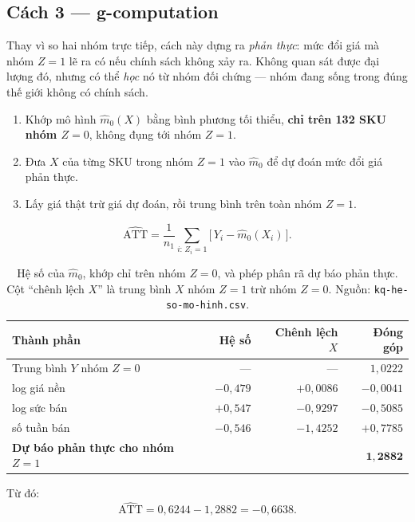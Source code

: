 \documentclass[11pt]{article}
\begin{document}
\subsection{Cách 3 --- g-computation}
\label{sec:cach-3}

Thay vì so hai nhóm trực tiếp, cách này dựng ra \emph{phản thực}: mức đổi giá mà nhóm $Z=1$ lẽ ra
có nếu chính sách không xảy ra. Không quan sát được đại lượng đó, nhưng có thể \emph{học} nó từ
nhóm đối chứng --- nhóm đang sống trong đúng thế giới không có chính sách.

\begin{enumerate}
  \item Khớp mô hình $\hat m_0(X)$ bằng bình phương tối thiểu, \textbf{chỉ trên 132 SKU nhóm
  $Z=0$}, không đụng tới nhóm $Z=1$.
  \item Đưa $X$ của từng SKU trong nhóm $Z=1$ vào $\hat m_0$ để dự đoán mức đổi giá phản thực.
  \item Lấy giá thật trừ giá dự đoán, rồi trung bình trên toàn nhóm $Z=1$.
\end{enumerate}

\begin{equation}
  \widehat{\mathrm{ATT}}
  = \frac{1}{n_1}\sum_{i:\,Z_i = 1} \Big[\, Y_i - \hat m_0(X_i) \,\Big].
  \label{eq:g-comp}
\end{equation}

\begin{table}[htbp]
  \centering
  \caption{Hệ số của $\hat m_0$, khớp chỉ trên nhóm $Z=0$, và phép phân rã dự báo phản thực. Cột
  ``chênh lệch $X$'' là trung bình $X$ nhóm $Z=1$ trừ nhóm $Z=0$. Nguồn:
  \texttt{kq-he-so-mo-hinh.csv}.}
  \label{tab:g-comp}
  \begin{tabular}{lrrr}
    \toprule
    Thành phần & Hệ số & Chênh lệch $X$ & Đóng góp \\
    \midrule
    Trung bình $Y$ nhóm $Z=0$ & --- & --- & $1{,}0222$ \\
    log giá nền     & $-0{,}479$ & $+0{,}0086$ & $-0{,}0041$ \\
    log sức bán     & $+0{,}547$ & $-0{,}9297$ & $-0{,}5085$ \\
    số tuần bán     & $-0{,}546$ & $-1{,}4252$ & $+0{,}7785$ \\
    \midrule
    \textbf{Dự báo phản thực cho nhóm $Z=1$} & & & $\mathbf{1{,}2882}$ \\
    \bottomrule
  \end{tabular}
\end{table}

Từ đó:
\[
  \widehat{\mathrm{ATT}} = 0{,}6244 - 1{,}2882 = -0{,}6638.
\]
\end{document}
